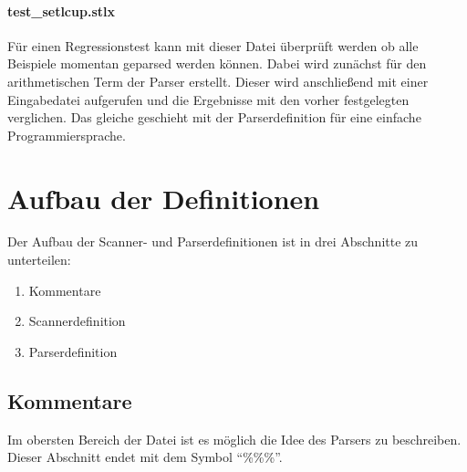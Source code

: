 \paragraph{test\_setlcup.stlx} Für einen Regressionstest kann mit dieser Datei überprüft werden ob alle Beispiele momentan geparsed werden können. Dabei wird zunächst für den arithmetischen Term der Parser erstellt. Dieser wird anschließend mit einer Eingabedatei aufgerufen und die Ergebnisse mit den vorher festgelegten verglichen. Das gleiche geschieht mit der Parserdefinition für eine einfache Programmiersprache.
\section{Aufbau der Definitionen}

Der Aufbau der Scanner- und Parserdefinitionen ist in drei Abschnitte zu unterteilen:
\begin{enumerate}
	\item Kommentare
	\item Scannerdefinition
	\item Parserdefinition
\end{enumerate}
\subsection{Kommentare}
Im obersten Bereich der Datei ist es möglich die Idee des Parsers zu beschreiben.
Dieser Abschnitt endet mit dem Symbol "`\%\%\%"'. 
